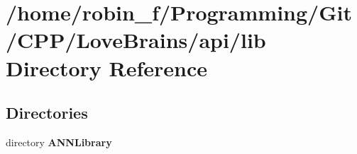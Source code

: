 \section{/home/robin\+\_\+f/\+Programming/\+Git/\+C\+P\+P/\+Love\+Brains/api/lib Directory Reference}
\label{dir_57e6a566189571d5740a35c1eca36561}
\subsection*{Directories}
\begin{DoxyCompactItemize}
\item 
directory {\bf A\+N\+N\+Library}
\end{DoxyCompactItemize}
